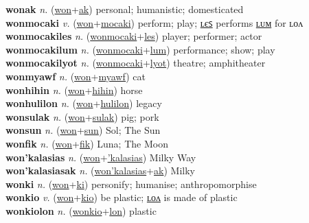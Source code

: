 \textbf{wonak} \textit{n.} (\hyperref[won]{won}+\hyperref[ak]{ak})
personal; humanistic; domesticated \label{wonak} \\
\textbf{wonmocaki} \textit{v.} (\hyperref[won]{won}+\hyperref[mocaki]{mocaki})
perform; play; \hyperref[wonmocakiles]{ʟєꜱ} performs \hyperref[wonmocakilum]{ʟᴜᴍ} for ʟᴏᴧ \label{wonmocaki} \\
\textbf{wonmocakiles} \textit{n.} (\hyperref[wonmocaki]{wonmocaki}+\hyperref[les]{les})
player; performer; actor \label{wonmocakiles} \\
\textbf{wonmocakilum} \textit{n.} (\hyperref[wonmocaki]{wonmocaki}+\hyperref[lum]{lum})
performance; show; play \label{wonmocakilum} \\
\textbf{wonmocakilyot} \textit{n.} (\hyperref[wonmocaki]{wonmocaki}+\hyperref[lyot]{lyot})
theatre; amphitheater \label{wonmocakilyot} \\
\textbf{wonmyawf} \textit{n.} (\hyperref[won]{won}+\hyperref[myawf]{myawf})
cat \label{wonmyawf} \\
\textbf{wonhihin} \textit{n.} (\hyperref[won]{won}+\hyperref[hihin]{hihin})
horse \label{wonhihin} \\
\textbf{wonhulilon} \textit{n.} (\hyperref[won]{won}+\hyperref[hulilon]{hulilon})
legacy \label{wonhulilon} \\
\textbf{wonsulak} \textit{n.} (\hyperref[won]{won}+\hyperref[sulak]{sulak})
pig; pork \label{wonsulak} \\
\textbf{wonsun} \textit{n.} (\hyperref[won]{won}+\hyperref[sun]{sun})
Sol; The Sun \label{wonsun} \\
\textbf{wonfik} \textit{n.} (\hyperref[won]{won}+\hyperref[fik]{fik})
Luna; The Moon \label{wonfik} \\
\textbf{won'kalasias} \textit{n.} (\hyperref[won]{won}+\hyperref['kalasias]{'kalasias})
Milky Way \label{won'kalasias} \\
\textbf{won'kalasiasak} \textit{n.} (\hyperref[won'kalasias]{won'kalasias}+\hyperref[ak]{ak})
Milky \label{won'kalasiasak} \\
\textbf{wonki} \textit{n.} (\hyperref[won]{won}+\hyperref[ki]{ki})
personify; humanise; anthropomorphise \label{wonki} \\
\textbf{wonkio} \textit{v.} (\hyperref[won]{won}+\hyperref[kio]{kio})
be plastic; \hyperref[wonkiolon]{ʟᴏᴧ} is made of plastic \label{wonkio} \\
\textbf{wonkiolon} \textit{n.} (\hyperref[wonkio]{wonkio}+\hyperref[lon]{lon})
plastic \label{wonkiolon} \\
